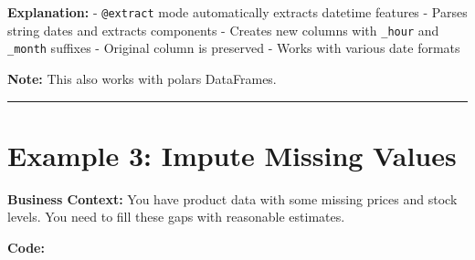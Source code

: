 \documentclass[
  letterpaper,
]{scrbook}
\begin{document}
\textbf{Explanation:} -
\texttt{\textquotesingle{}@extract\textquotesingle{}} mode automatically
extracts datetime features - Parses string dates and extracts components
- Creates new columns with \texttt{\_hour} and \texttt{\_month} suffixes
- Original column is preserved - Works with various date formats

\textbf{Note:} This also works with polars DataFrames.

\begin{center}\rule{0.5\linewidth}{0.5pt}\end{center}

\section{Example 3: Impute Missing
Values}\label{example-3-impute-missing-values}

\textbf{Business Context:} You have product data with some missing
prices and stock levels. You need to fill these gaps with reasonable
estimates.

\textbf{Code:}
\end{document}
